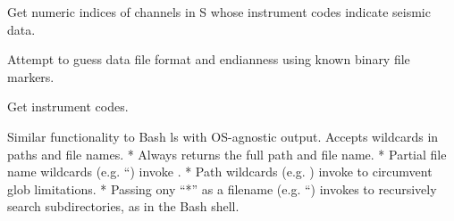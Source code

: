\documentclass[letterpaper,11pt,english]{sphinxmanual}
\begin{document}
Get numeric indices of channels in S whose instrument codes indicate seismic data.

\begin{fulllineitems}
\label{\detokenize{src/Appendices/function_list:guess}}
\end{fulllineitems}


Attempt to guess data file format and endianness using known binary file markers.

\begin{fulllineitems}
\label{\detokenize{src/Appendices/function_list:inst_code}}
\end{fulllineitems}


\begin{fulllineitems}
\end{fulllineitems}


\begin{fulllineitems}
\end{fulllineitems}


Get instrument codes.

\begin{fulllineitems}
\label{\detokenize{src/Appendices/function_list:ls}}
\end{fulllineitems}


Similar functionality to Bash ls with OS-agnostic output. Accepts wildcards in paths and file names.
* Always returns the full path and file name.
* Partial file name wildcards (e.g. “) invoke .
* Path wildcards (e.g. ) invoke  to circumvent glob limitations.
* Passing ony “*” as a filename (e.g. “) invokes  to recursively search subdirectories, as in the Bash shell.
\end{document}
